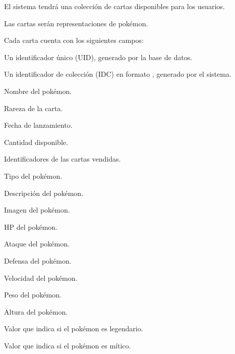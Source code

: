 


\begin{RFColeccionCartas}
	\item El sistema tendrá una colección de cartas disponibles para los usuarios.
	\begin{RFColeccionCartas}
		\item Las cartas serán representaciones de pokémon.
		\item Cada carta cuenta con los siguientes campos:
		\begin{RFColeccionCartas}
			\item Un identificador único (UID), generado por la base de datos.
			\item Un identificador de colección (IDC) en formato , generado por el sistema.
			\item Nombre del pokémon.
			\item Rareza de la carta.
			\item Fecha de lanzamiento.
			\item Cantidad disponible.
			\item Identificadores de las cartas vendidas.
			\item Tipo del pokémon.
			\item Descripción del pokémon.
			\item Imagen del pokémon.
			\item HP del pokémon.
			\item Ataque del pokémon.
			\item Defensa del pokémon.
			\item Velocidad del pokémon.
			\item Peso del pokémon.
			\item Altura del pokémon.
			\item Valor que indica si el pokémon es legendario.
			\item Valor que indica si el pokémon es mítico.

\end{RFColeccionCartas}
\end{RFColeccionCartas}
\end{RFColeccionCartas}
